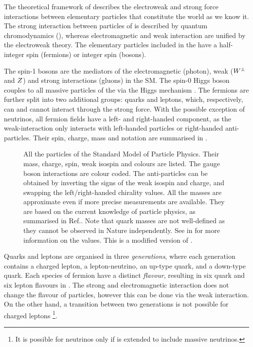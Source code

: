 The theoretical framework of \SM describes the electroweak and strong force interactions between elementary particles that constitute the world as we know it.
The strong interaction between particles of \SM is described by quantum chromodynamics (\QCD), 
whereas electromagnetic and weak interaction are unified by the electroweak theory.
The elementary particles included in the \SM have a half-integer spin (fermions) or integer spin (bosons).

The spin-1 bosons are the mediators of the electromagnetic (photon), weak ($W^\pm$ and $Z$) and strong interactions (gluons) in the SM.
The spin-0 Higgs boson couples to all massive particles of the \SM via the Higgs mechanism \cite{PhysRevLett.13.508}.
The fermions are further split into two additional groups: quarks and leptons, which, respectively, can and cannot interact through the strong force.
With the possible exception of neutrinos, all fermion fields have a left- and right-handed component, as the weak-interaction only interacts with
left-handed particles or right-handed anti-particles.
Their spin, charge, mass and notation are summarised in .
\begin{figure}[htbp!]
    \centering
    
    \caption{\label{fig:standard_model} All the particles of the Standard Model of Particle Physics.
    Their mass, charge, spin, weak isospin and colours are listed.
    The gauge boson interactions are colour coded.
    The anti-particles can be obtained by inverting the signs of the weak isospin and charge, and swapping the left/right-handed chirality values.
    All the masses are approximate even if more precise measurements are available.
    They are based on the current knowledge of particle physics, as summarised in Ref.\cite{Workman:2022ynf}.
    Note that quark masses are not well-defined as they cannot be observed in Nature independently.
    See in \cite{Workman:2022ynf} for more information on the values.
    This is a modified version of \cite{sm_diagram}.
    }
\end{figure}

Quarks and leptons are organised in three \textit{generations}, 
where each generation contains a charged lepton, a lepton-neutrino, an up-type quark, and a down-type quark.
Each species of fermion have a distinct \textit{flavour}, resulting in six quark and six lepton flavours in \SM.
The strong and electromagnetic interaction does not change the flavour of particles, 
however this can be done via the weak interaction.
On the other hand, a transition between two generations is not possible for charged leptons
\footnote{It is possible for neutrinos only if \SM is extended to include massive neutrinos.}.

